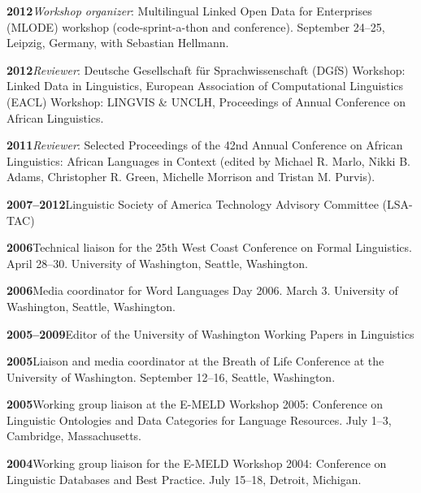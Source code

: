 \documentclass[11pt]{article}
\newcommand{\hangpara}{
 \setlength{\parindent}{0in} %
 \hangindent=0.42in %
}
\begin{document}
\vskip 6pt
\hangpara
{\bf 2012}\hspace{1ex}\textit{Workshop organizer}: Multilingual Linked Open Data for Enterprises (MLODE) workshop (code-sprint-a-thon and conference). September 24--25, Leipzig, Germany, with Sebastian Hellmann.

\vskip 6pt
\hangpara
{\bf 2012}\hspace{1ex}\textit{Reviewer}: Deutsche Gesellschaft f{\"u}r Sprachwissenschaft (DGfS) Workshop: Linked Data in Linguistics, European Association of Computational Linguistics (EACL) Workshop: LINGVIS \& UNCLH, Proceedings of Annual Conference on African Linguistics.

\vskip 6pt
\hangpara
{\bf 2011}\hspace{1ex}\textit{Reviewer}: Selected Proceedings of the 42nd Annual Conference on African Linguistics: African Languages in Context (edited by Michael R. Marlo, Nikki B. Adams, Christopher R. Green, Michelle Morrison and Tristan M. Purvis).

\vskip 6pt
\hangpara
{\bf 2007--2012}\hspace{1ex}Linguistic Society of America Technology Advisory Committee (LSA-TAC)

\vskip 6pt
\hangpara
{\bf 2006}\hspace{1ex}Technical liaison for the 25th West Coast Conference on Formal Linguistics. April 28--30. University of Washington, Seattle, Washington.

\vskip 6pt
\hangpara
{\bf 2006}\hspace{1ex}Media coordinator for Word Languages Day 2006. March 3. University of Washington, Seattle, Washington.	

\vskip 6pt
\hangpara
{\bf 2005--2009}\hspace{1ex}Editor of the University of Washington Working Papers in Linguistics

\vskip 6pt
\hangpara
{\bf 2005}\hspace{1ex}Liaison and media coordinator at the Breath of Life Conference at the University of Washington. September 12--16, Seattle, Washington.

\vskip 6pt
\hangpara
{\bf 2005}\hspace{1ex}Working group liaison at the E-MELD Workshop 2005: Conference on Linguistic Ontologies and Data Categories for Language Resources. July 1--3, Cambridge, Massachusetts.

\vskip 6pt
\hangpara
{\bf 2004}\hspace{1ex}Working group liaison for the E-MELD Workshop 2004: Conference on Linguistic Databases and Best Practice. July 15--18, Detroit, Michigan.
\end{document}
